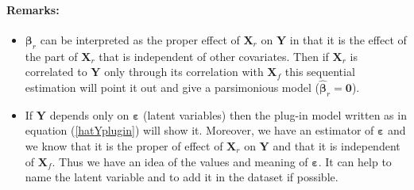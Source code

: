 \documentclass[12pt,a4paper]{report}
\begin{document}
	\paragraph{Remarks:} 
	\begin{itemize}
		\item $\boldsymbol{\beta}_{r}$ can be interpreted as the proper effect of $\boldsymbol{X}_r$ on $\boldsymbol{Y}$ in that it is the effect of the part of $\boldsymbol{X}_r$ that is independent of other covariates. Then if $\boldsymbol{X}_r$ is correlated to $\boldsymbol{Y}$ only through its correlation with $\boldsymbol{X}_f$ this sequential estimation will point it out and give a parsimonious model ($\hat{\boldsymbol{\beta}}_r=\boldsymbol{0}$).
		\item If $\boldsymbol{Y}$ depends only on $\boldsymbol{\varepsilon}$ (latent variables) then the plug-in model written as in equation (\ref{hatYplugin}) will show it. Moreover, we have an estimator of $\boldsymbol{\varepsilon}$ and we know that it is the proper of effect of $\boldsymbol{X}_r$ on $\boldsymbol{Y}$ and that it is independent of $\boldsymbol{X}_f$. Thus we have an idea of the values and meaning of $\boldsymbol{\varepsilon}$. It can help to name the latent variable and to add it in the dataset if possible.
	\end{itemize}
	
%			
			
\end{document}
